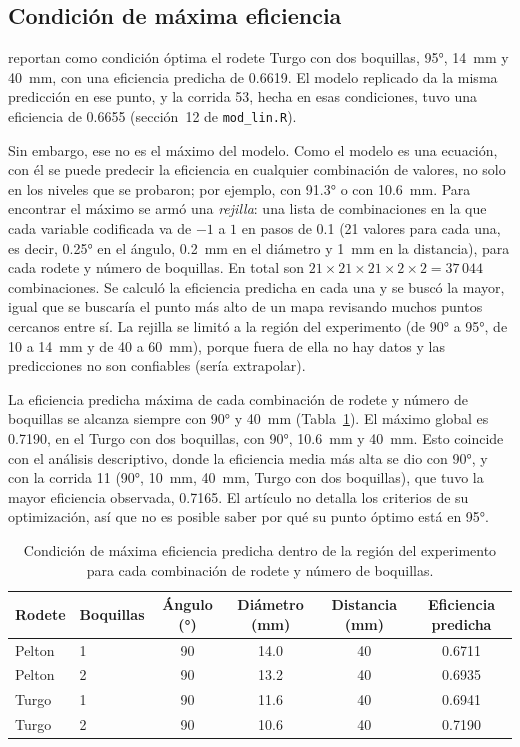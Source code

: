 \subsection{Condición de máxima eficiencia}

\citet{Lakdawala2025} reportan como condición óptima el rodete Turgo con dos boquillas, 95°, 14~mm y 40~mm, con una eficiencia predicha de 0.6619. El modelo replicado da la misma predicción en ese punto, y la corrida 53, hecha en esas condiciones, tuvo una eficiencia de 0.6655 (sección~12 de \texttt{mod\_lin.R}).

Sin embargo, ese no es el máximo del modelo. Como el modelo es una ecuación, con él se puede predecir la eficiencia en cualquier combinación de valores, no solo en los niveles que se probaron; por ejemplo, con 91.3° o con 10.6~mm. Para encontrar el máximo se armó una \emph{rejilla}: una lista de combinaciones en la que cada variable codificada va de $-1$ a $1$ en pasos de 0.1 (21 valores para cada una, es decir, 0.25° en el ángulo, 0.2~mm en el diámetro y 1~mm en la distancia), para cada rodete y número de boquillas. En total son $21 \times 21 \times 21 \times 2 \times 2 = 37\,044$ combinaciones. Se calculó la eficiencia predicha en cada una y se buscó la mayor, igual que se buscaría el punto más alto de un mapa revisando muchos puntos cercanos entre sí. La rejilla se limitó a la región del experimento (de 90° a 95°, de 10 a 14~mm y de 40 a 60~mm), porque fuera de ella no hay datos y las predicciones no son confiables (sería extrapolar).

La eficiencia predicha máxima de cada combinación de rodete y número de boquillas se alcanza siempre con 90° y 40~mm (Tabla~\ref{tab:maximos}). El máximo global es 0.7190, en el Turgo con dos boquillas, con 90°, 10.6~mm y 40~mm. Esto coincide con el análisis descriptivo, donde la eficiencia media más alta se dio con 90°, y con la corrida 11 (90°, 10~mm, 40~mm, Turgo con dos boquillas), que tuvo la mayor eficiencia observada, 0.7165. El artículo no detalla los criterios de su optimización, así que no es posible saber por qué su punto óptimo está en 95°.

\begin{table}[ht]
\centering
\caption{Condición de máxima eficiencia predicha dentro de la región del experimento para cada combinación de rodete y número de boquillas.}
\label{tab:maximos}
\begin{tabular}{llcccc}
\toprule
Rodete & Boquillas & Ángulo (°) & Diámetro (mm) & Distancia (mm) & Eficiencia predicha \\
\midrule
Pelton & 1 & 90 & 14.0 & 40 & 0.6711 \\
Pelton & 2 & 90 & 13.2 & 40 & 0.6935 \\
Turgo  & 1 & 90 & 11.6 & 40 & 0.6941 \\
Turgo  & 2 & 90 & 10.6 & 40 & 0.7190 \\
\bottomrule
\end{tabular}
\end{table}
